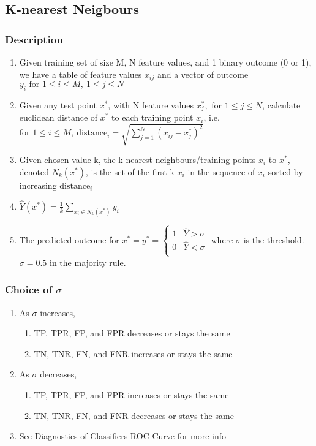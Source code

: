 \documentclass[../../dsa1101_notes.Rtex]{subfiles}\usepackage[]{graphicx}\usepackage[]{color}
\begin{document}
\subsection{K-nearest Neigbours}
\subsubsection{Description}
\begin{enumerate}
	\item Given training set of size M, N feature values, and 1 binary outcome (0 or 1), we have a table of feature values \(x_{ij}\) and a vector of outcome \(y_i \text{ for } 1 \leq i \leq M,\ 1 \leq j \leq N\)
	\item Given any test point \(x^*\), with N feature values \(x^*_j, \text{ for } 1 \leq j \leq N\), calculate euclidean distance of \(x^*\) to each training point \(x_i\), i.e. \(\text{for } 1 \leq i \leq M,\ \text{distance}_i = \sqrt{\sum \limits_{j=1}^N (x_{ij} - x^*_j)^2} \)
	\item Given chosen value k, the k-nearest neighbours/training points \(x_i\) to \(x^*\), denoted \(N_k(x^*)\), is the set of the first k \(x_i\) in the sequence of \(x_i\) sorted by increasing \(\text{distance}_i\)
	\item \(\hat{Y}(x^*) = \frac{1}{k} \sum \limits_{x_i \in N_k(x^*)} y_i\)
	\item The predicted outcome for \(x^* = y^* = \begin{cases}
		1 & \hat{Y} > \sigma \\
		0 & \hat{Y} < \sigma \\
	\end{cases} \text{ where } \sigma\) is the threshold. \(\sigma = 0.5\) in the majority rule.
\end{enumerate}

\subsubsection{Choice of \(\sigma\)}
\begin{enumerate}
    \item As \(\sigma\) increases,
    \begin{enumerate}
      \item TP, TPR, FP, and FPR decreases or stays the same
      \item TN, TNR, FN, and FNR increases or stays the same
    \end{enumerate}
    \item As \(\sigma\) decreases,
    \begin{enumerate}
      \item TP, TPR, FP, and FPR increases or stays the same
      \item TN, TNR, FN, and FNR decreases or stays the same
    \end{enumerate}
    \item See Diagnostics of Classifiers ROC Curve for more info
\end{enumerate}
\end{document}
